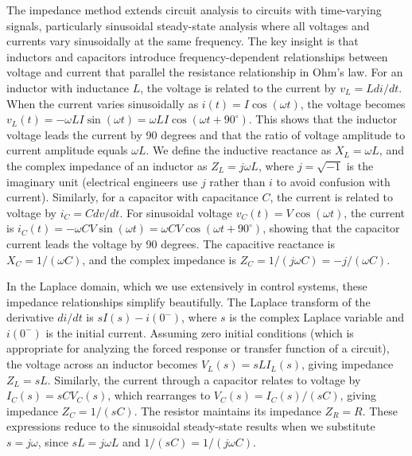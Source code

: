 The impedance method extends circuit analysis to circuits with time-varying signals, particularly sinusoidal steady-state analysis where all voltages and currents vary sinusoidally at the same frequency. The key insight is that inductors and capacitors introduce frequency-dependent relationships between voltage and current that parallel the resistance relationship in Ohm's law. For an inductor with inductance $L$, the voltage is related to the current by $v_L = L di/dt$. When the current varies sinusoidally as $i(t) = I \cos(\omega t)$, the voltage becomes $v_L(t) = -\omega L I \sin(\omega t) = \omega L I \cos(\omega t + 90^\circ)$. This shows that the inductor voltage leads the current by 90 degrees and that the ratio of voltage amplitude to current amplitude equals $\omega L$. We define the inductive reactance as $X_L = \omega L$, and the complex impedance of an inductor as $Z_L = j\omega L$, where $j = \sqrt{-1}$ is the imaginary unit (electrical engineers use $j$ rather than $i$ to avoid confusion with current). Similarly, for a capacitor with capacitance $C$, the current is related to voltage by $i_C = C dv/dt$. For sinusoidal voltage $v_C(t) = V \cos(\omega t)$, the current is $i_C(t) = -\omega C V \sin(\omega t) = \omega C V \cos(\omega t + 90^\circ)$, showing that the capacitor current leads the voltage by 90 degrees. The capacitive reactance is $X_C = 1/(\omega C)$, and the complex impedance is $Z_C = 1/(j\omega C) = -j/(\omega C)$.

In the Laplace domain, which we use extensively in control systems, these impedance relationships simplify beautifully. The Laplace transform of the derivative $di/dt$ is $sI(s) - i(0^-)$, where $s$ is the complex Laplace variable and $i(0^-)$ is the initial current. Assuming zero initial conditions (which is appropriate for analyzing the forced response or transfer function of a circuit), the voltage across an inductor becomes $V_L(s) = sL I_L(s)$, giving impedance $Z_L = sL$. Similarly, the current through a capacitor relates to voltage by $I_C(s) = sC V_C(s)$, which rearranges to $V_C(s) = I_C(s)/(sC)$, giving impedance $Z_C = 1/(sC)$. The resistor maintains its impedance $Z_R = R$. These expressions reduce to the sinusoidal steady-state results when we substitute $s = j\omega$, since $sL = j\omega L$ and $1/(sC) = 1/(j\omega C)$.

